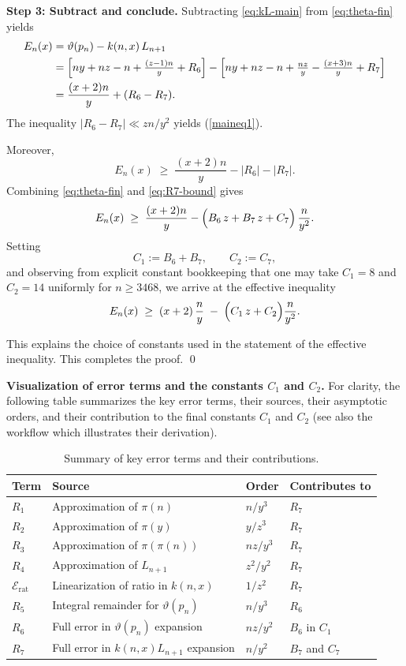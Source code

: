 \documentclass[10pt]{amsart}
\theoremstyle{definition} %
\numberwithin{equation}{section}
\begin{document}
\medskip
\noindent\textbf{Step 3: Subtract and conclude.}
Subtracting \eqref{eq:kL-main} from \eqref{eq:theta-fin} yields
\[
\begin{aligned}
E_n(x)
&=\vartheta(p_n)-k(n,x)\,L_{n+1}\\
&=\Bigl[ny+nz-n+\tfrac{(z-1)n}{y}+R_6\Bigr]
 -\Bigl[ny+nz-n+\tfrac{n z}{y}-\tfrac{(x+3)n}{y}+R_7\Bigr]\\
&=\frac{(x+2)n}{y}+(R_6-R_7).
\end{aligned}
\]
The inequality $|R_6-R_7| \ll zn/y^2$ yields (\ref{maineq1}).

Moreover,
\[
E_n(x)\;\ge\;\frac{(x+2)n}{y}-|R_6|-|R_7|.
\]
Combining \eqref{eq:theta-fin} and \eqref{eq:R7-bound} gives
\[
E_n(x)\;\ge\;\frac{(x+2)n}{y}
-\Bigl(B_6\,z+B_7\,z+C_7\Bigr)\,\frac{n}{y^2}.
\]
Setting
\[
C_1:=B_6+B_7,\qquad C_2:=C_7,
\]
and observing from explicit constant bookkeeping that one may take $C_1=8$ and
$C_2=14$ uniformly for $n\ge 3468$, we arrive at the effective inequality
\[
E_n(x)\;\ge\;(x+2)\,\frac{n}{y}\;-\;\Bigl(C_1\,z+C_2\Bigr)\frac{n}{y^2}.
\]

This explains the choice of constants used in the statement of the effective
inequality. This completes the proof. \qed


\medskip\noindent
\textbf{Visualization of error terms and the constants $C_1$ and $C_2$.}
For clarity, the following table summarizes the key error terms, their sources, their asymptotic orders, and their contribution to the final constants $C_1$ and $C_2$ (see also the workflow which illustrates their derivation).
\begin{table}[h!]
    \centering
   \begin{tabular}{p{0.8cm} p{6cm} p{2cm} p{2.5cm}}
        \hline
        \textbf{Term} & \textbf{Source} & \textbf{Order} & \textbf{Contributes to} \\
        \hline
        $R_1$ & Approximation of $\pi(n)$ & $n/y^3$ & $R_7$ \\
        $R_2$ & Approximation of $\pi(y)$ & $y / z^3$ & $R_7$ \\
        $R_3$ & Approximation of $\pi(\pi(n))$ & $nz/ y^3$ & $R_7$ \\
        $R_4$ & Approximation of $L_{n+1}$ & $z^2 / y^2$ & $R_7$ \\
        $\mathcal{E}_{\mathrm{rat}}$ & Linearization of ratio in $k(n,x)$ & $1/z^2$ & $R_7$ \\
        $R_5$ & Integral remainder for $\vartheta(p_n)$ & $n/y^3$ & $R_6$ \\
        $R_6$ & Full error in $\vartheta(p_n)$ expansion & $n z / y^2$ & $B_6$ in $C_1$ \\
        $R_7$ & Full error in $k(n,x)L_{n+1}$ expansion & $n / y^2$ &  $B_7$ and $C_7$ \\
        \hline
    \end{tabular}
    \caption{Summary of key error terms and their contributions.}
    \label{tab:error-summary}
\end{table}
\end{document}
